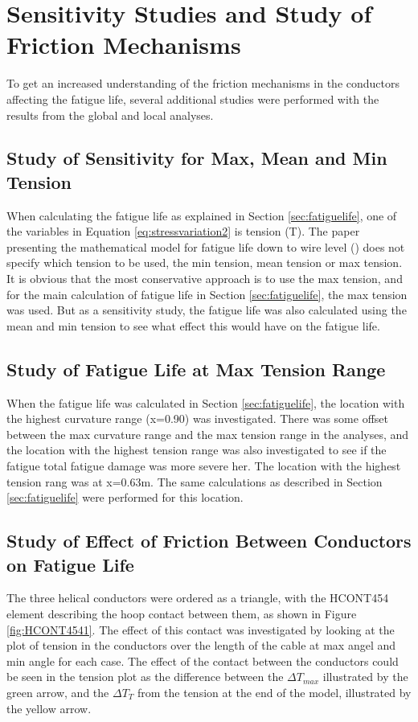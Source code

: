 \section{Sensitivity Studies and Study of Friction Mechanisms}
To get an increased understanding of the friction mechanisms in the conductors affecting the fatigue life, several additional studies were performed with the results from the global and local analyses.
\subsection{Study of Sensitivity for Max, Mean and Min Tension}
\label{sec:min}
When calculating the fatigue life as explained in Section \ref{sec:fatiguelife}, one of the variables in Equation \ref{eq:stressvariation2} is tension (T). The paper presenting the mathematical model for fatigue life down to wire level (\cite{s300}) does not specify which tension to be used, the min tension, mean tension or max tension. It is obvious that the most conservative approach is to use the max tension, and for the main calculation of fatigue life in Section \ref{sec:fatiguelife}, the max tension was used. But as a sensitivity study, the fatigue life was also calculated using the mean and min tension to see what effect this would have on the fatigue life. 
\subsection{Study of Fatigue Life at Max Tension Range}
When the fatigue life was calculated in Section \ref{sec:fatiguelife}, the location with the highest curvature range (x=0.90) was investigated. There was some offset between the max curvature range and the max tension range in the analyses, and  the location with the highest tension range was also investigated to see if the fatigue total fatigue damage was more severe her. The location with the highest tension rang was at x=0.63m. The same calculations as described in Section \ref{sec:fatiguelife} were performed for this location.  
\subsection{Study of Effect of Friction Between Conductors on Fatigue Life}
The three helical conductors were ordered as a triangle, with the HCONT454 element describing the hoop contact between them, as shown in Figure \ref{fig:HCONT4541}. The effect of this contact was investigated by looking at the plot of tension in the conductors over the length of the cable at max angel and min angle for each case. The effect of the contact between the conductors could be seen in the tension plot as the difference between the $\Delta T_{max}$ illustrated by the green arrow, and the $\Delta T_T$ from the tension at the end of the model, illustrated by the yellow arrow. 

